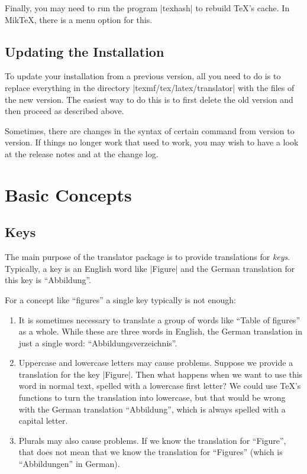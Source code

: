 \documentclass{ltxdoc}
\begin{document}
Finally, you may need to run the program |texhash| to rebuild \TeX's
cache. In Mik\TeX, there is a menu option for this.


\subsection{Updating the Installation}

To update your installation from a previous version, all you need to
do is to replace everything in the directory |texmf/tex/latex/translator|
with the files of the new version. The easiest way to do this is to
first delete the old version and then proceed as described above.

Sometimes, there are changes in the syntax of certain command from
version to version. If things no longer work that used to work, you
may wish to have a look at the release notes and at the change log. 



\section{Basic Concepts}

\subsection{Keys}

The main purpose of the translator package is to provide translations
for \emph{keys}. Typically, a key is an English word like |Figure|
and the German translation for this key is ``Abbildung''.

For a concept like ``figures'' a single key typically is not enough:
\begin{enumerate}
\item
  It is sometimes necessary to translate a group of words like ``Table
  of figures'' as a whole. While these are three words in English,
  the German translation in just a single word:
  ``Abbildungsverzeichnis''.
\item
  Uppercase and lowercase letters may cause problems. Suppose we
  provide a translation for the key |Figure|. Then what happens
  when we want to use this word in normal text, spelled with a
  lowercase first letter? We could use \TeX's functions to turn the
  translation into lowercase, but that would be wrong with the German
  translation ``Abbildung'', which is always spelled with a capital
  letter.
\item 
  Plurals may also cause problems. If we know the translation for
  ``Figure'', that does not mean that we know the translation for
  ``Figures'' (which is ``Abbildungen'' in German).
\end{enumerate}
\end{document}
